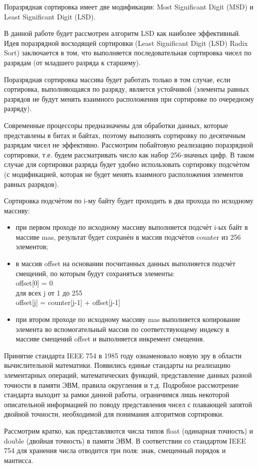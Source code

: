 \documentclass{article}
\begin{document}
\par Поразрядная сортировка имеет две модификации: Most Significant Digit (MSD) и Least Significant Digit (LSD).
\par В данной работе будет рассмотрен алгоритм LSD как наиболее эффективный. Идея поразрядной восходящей сортировки (Least Significant Digit (LSD) Radix Sort) заключается в том, что выполняется последовательная сортировка чисел по разрядам (от младшего разряда к старшему).
\par Поразрядная сортировка массива будет работать только в том случае, если сортировка, выполняющаяся по разряду, является устойчивой (элементы равных разрядов не будут менять взаимного расположения при сортировке по очередному разряду).
\par Современные процессоры предназначены для обработки данных, которые представлены в битах и байтах, поэтому выполнять сортировку по десятичным разрядам чисел не эффективно. Рассмотрим побайтовую реализацию поразрядной сортировки, т.е. будем рассматривать число как набор 256-значных цифр. В таком случае для сортировки разряда будет удобно использовать сортировку подсчѐтом (с модификацией, которая не будет менять взаимного расположения элементов равных разрядов).
\par Сортировка подсчѐтом по i-му байту будет проходить в два прохода по исходному массиву:
\begin{itemize}
\item при первом проходе по исходному массиву выполняется подсчѐт i-ых байт в массиве mas, результат будет сохранѐн в массив подсчѐтов counter из 256 элементов;
\item в массив offset на основании посчитанных данных выполняется подсчѐт смещений, по которым будут сохраняться элементы: \\
offset[0] = 0 \\
для всех j от 1 до 255  \\
offset[j] = counter[j-1] + offset[j-1]
\item при втором проходе по исходному массиву mas выполняется копирование элемента во вспомогательный массив по соответствующему индексу в массиве смещений offset и выполняется инкремент смещения.
\end{itemize}
\par Принятие стандарта IEEE 754 в 1985 году ознаменовало новую эру в области вычислительной математики. Появились единые стандарты на реализацию элементарных операций, математических функций, представление данных разной точности в памяти ЭВМ, правила округления и т.д. Подробное рассмотрение стандарта выходит за рамки данной работы, ограничимся лишь некоторой описательной информацией по поводу представления чисел с плавающей запятой двойной точности, необходимой для понимания алгоритмов сортировки.
\par Рассмотрим кратко, как представляются числа типов float (одинарная точность) и double (двойная точность) в памяти ЭВМ. В соответствии со стандартом IEEE 754 для хранения числа отводится три поля: знак, смещенный порядок и мантисса.
\end{document}
